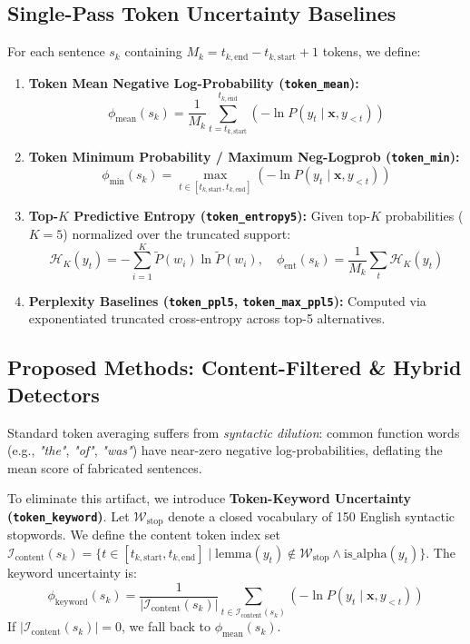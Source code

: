 \documentclass[conference]{IEEEtran}
\begin{document}
\subsection{Single-Pass Token Uncertainty Baselines}
For each sentence $s_k$ containing $M_k = t_{k, \text{end}} - t_{k, \text{start}} + 1$ tokens, we define:
\begin{enumerate}
    \item \textbf{Token Mean Negative Log-Probability (\texttt{token\_mean}):}
    \begin{equation}
        \phi_{\text{mean}}(s_k) = \frac{1}{M_k} \sum_{t=t_{k, \text{start}}}^{t_{k, \text{end}}} \left( - \ln P(y_t \mid \mathbf{x}, y_{<t}) \right)
    \end{equation}
    \item \textbf{Token Minimum Probability / Maximum Neg-Logprob (\texttt{token\_min}):}
    \begin{equation}
        \phi_{\text{min}}(s_k) = \max_{t \in [t_{k, \text{start}}, t_{k, \text{end}}]} \left( - \ln P(y_t \mid \mathbf{x}, y_{<t}) \right)
    \end{equation}
    \item \textbf{Top-$K$ Predictive Entropy (\texttt{token\_entropy5}):}
    Given top-$K$ probabilities ($K=5$) normalized over the truncated support:
    \begin{equation}
        \mathcal{H}_K(y_t) = - \sum_{i=1}^K \tilde{P}(w_i) \ln \tilde{P}(w_i), \quad \phi_{\text{ent}}(s_k) = \frac{1}{M_k} \sum_{t} \mathcal{H}_K(y_t)
    \end{equation}
    \item \textbf{Perplexity Baselines (\texttt{token\_ppl5}, \texttt{token\_max\_ppl5}):}
    Computed via exponentiated truncated cross-entropy across top-5 alternatives.
\end{enumerate}

\subsection{Proposed Methods: Content-Filtered \& Hybrid Detectors}
Standard token averaging suffers from \textit{syntactic dilution}: common function words (e.g., \textit{"the"}, \textit{"of"}, \textit{"was"}) have near-zero negative log-probabilities, deflating the mean score of fabricated sentences. 

To eliminate this artifact, we introduce \textbf{Token-Keyword Uncertainty (\texttt{token\_keyword})}. Let $\mathcal{W}_{\text{stop}}$ denote a closed vocabulary of 150 English syntactic stopwords. We define the content token index set $\mathcal{I}_{\text{content}}(s_k) = \{ t \in [t_{k, \text{start}}, t_{k, \text{end}}] \mid \text{lemma}(y_t) \notin \mathcal{W}_{\text{stop}} \land \text{is\_alpha}(y_t) \}$. The keyword uncertainty is:
\begin{equation}
    \phi_{\text{keyword}}(s_k) = \frac{1}{|\mathcal{I}_{\text{content}}(s_k)|} \sum_{t \in \mathcal{I}_{\text{content}}(s_k)} \left( - \ln P(y_t \mid \mathbf{x}, y_{<t}) \right)
\end{equation}
If $|\mathcal{I}_{\text{content}}(s_k)| = 0$, we fall back to $\phi_{\text{mean}}(s_k)$.
\end{document}
